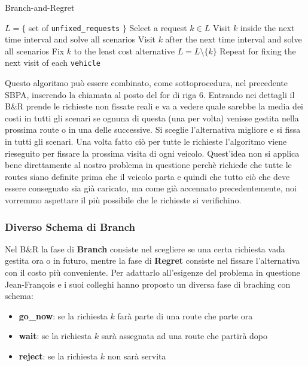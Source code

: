 \documentclass[
    article,            %
    12pt,                %
    oneside,            %
    a4paper,            %
    english,            %
    italian,                %
    sumario=tradicional,
]{abntex2}
\begin{document}
\begin{algorithm}
    \caption{Branch-and-Regret}
    \label{alg:BR}
    \begin{algorithmic}
        \State $L = \{$ set of \texttt{unfixed\_requests} $\}$
            \State Select a request $k\in L$
            \State Visit $k$ inside the next time interval and solve all scenarios
            \State Visit $k$ after the next time interval and solve all scenarios
            \State Fix $k$ to the least cost alternative
            \State $L = L \setminus \{k\}$
        \EndWhile
        \State Repeat for fixing the next visit of each \texttt{vehicle}
    \end{algorithmic}
\end{algorithm}

Questo algoritmo può essere combinato, come sottoprocedura, nel precedente SBPA, inserendo la chiamata al posto del for di riga 6. Entrando nei dettagli il B\&R prende le richieste non fissate reali e va a vedere quale sarebbe la media dei costi in tutti gli scenari se ognuna di questa (una per volta) venisse gestita nella prossima route o in una delle successive. Si sceglie l'alternativa migliore e si fissa in tutti gli scenari. Una volta fatto ciò per tutte le richieste l'algoritmo viene rieseguito per fissare la prossima visita di ogni veicolo. Quest'idea non si applica bene direttamente al nostro problema in questione perchè richiede che tutte le routes siano definite prima che il veicolo parta e quindi che tutto ciò che deve essere consegnato sia già caricato, ma come già accennato precedentemente, noi vorremmo aspettare il più possibile che le richieste si verifichino.

\hypertarget{diverso-schema-di-branch}{%
\subsubsection{Diverso Schema di Branch}\label{diverso-schema-di-branch}}
Nel B\&R la fase di \textbf{Branch} consiste nel scegliere se una certa richiesta vada gestita ora o in futuro, mentre la fase di \textbf{Regret} consiste nel fissare l'alternativa con il costo più conveniente. 
Per adattarlo all'esigenze del problema in questione Jean-François e i suoi colleghi hanno proposto un diversa fase di braching con schema:

\begin{itemize}
    \item \textbf{go\_now}: se la richiesta {\(k\)} farà parte di una route che parte ora
    \item \textbf{wait}: se la richiesta {\(k\)} sarà assegnata ad una route che partirà dopo
    \item \textbf{reject}: se la richiesta {\(k\)} non sarà servita
\end{itemize}
\end{document}
